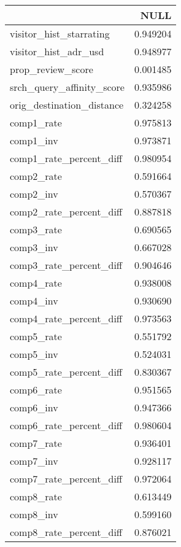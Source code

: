 \begin{tabular}{lr}
\toprule
 & NULL \\
\midrule
visitor_hist_starrating & 0.949204 \\
visitor_hist_adr_usd & 0.948977 \\
prop_review_score & 0.001485 \\
srch_query_affinity_score & 0.935986 \\
orig_destination_distance & 0.324258 \\
comp1_rate & 0.975813 \\
comp1_inv & 0.973871 \\
comp1_rate_percent_diff & 0.980954 \\
comp2_rate & 0.591664 \\
comp2_inv & 0.570367 \\
comp2_rate_percent_diff & 0.887818 \\
comp3_rate & 0.690565 \\
comp3_inv & 0.667028 \\
comp3_rate_percent_diff & 0.904646 \\
comp4_rate & 0.938008 \\
comp4_inv & 0.930690 \\
comp4_rate_percent_diff & 0.973563 \\
comp5_rate & 0.551792 \\
comp5_inv & 0.524031 \\
comp5_rate_percent_diff & 0.830367 \\
comp6_rate & 0.951565 \\
comp6_inv & 0.947366 \\
comp6_rate_percent_diff & 0.980604 \\
comp7_rate & 0.936401 \\
comp7_inv & 0.928117 \\
comp7_rate_percent_diff & 0.972064 \\
comp8_rate & 0.613449 \\
comp8_inv & 0.599160 \\
comp8_rate_percent_diff & 0.876021 \\
\bottomrule
\end{tabular}
